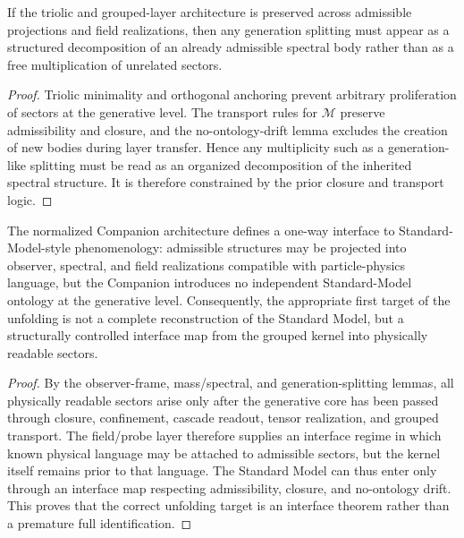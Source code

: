 \begin{lemma}
\label{lem:generation-splitting-lemma}
If the triolic and grouped-layer architecture is preserved across admissible projections and field realizations, then any generation splitting must appear as a structured decomposition of an already admissible spectral body rather than as a free multiplication of unrelated sectors.
\end{lemma}

\begin{proof}
Triolic minimality and orthogonal anchoring prevent arbitrary proliferation of sectors at the generative level. The transport rules for $\mathcal M$ preserve admissibility and closure, and the no-ontology-drift lemma excludes the creation of new bodies during layer transfer. Hence any multiplicity such as a generation-like splitting must be read as an organized decomposition of the inherited spectral structure. It is therefore constrained by the prior closure and transport logic.
\end{proof}

\begin{theorem}
\label{thm:standard-model-interface-theorem}
The normalized Companion architecture defines a one-way interface to Standard-Model-style phenomenology: admissible structures may be projected into observer, spectral, and field realizations compatible with particle-physics language, but the Companion introduces no independent Standard-Model ontology at the generative level. Consequently, the appropriate first target of the unfolding is not a complete reconstruction of the Standard Model, but a structurally controlled interface map from the grouped kernel into physically readable sectors.
\end{theorem}

\begin{proof}
By the observer-frame, mass/spectral, and generation-splitting lemmas, all physically readable sectors arise only after the generative core has been passed through closure, confinement, cascade readout, tensor realization, and grouped transport. The field/probe layer therefore supplies an interface regime in which known physical language may be attached to admissible sectors, but the kernel itself remains prior to that language. The Standard Model can thus enter only through an interface map respecting admissibility, closure, and no-ontology drift. This proves that the correct unfolding target is an interface theorem rather than a premature full identification.
\end{proof}

